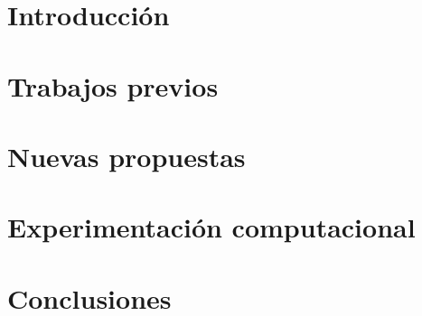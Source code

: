 \documentclass[11pt,a4paper]{tesis}
\begin{document}
\def\titulo{Licenciado }
\def\autor{Amit Stein, Juan Andrés Knebel}
\def\tituloTesis{Nuevos algoritmos para recuperación de ``ítems empaquetados'': \mbox{Algo}}
\def\runtitulo{Nuevos algoritmos para recuperación de ``ítems empaquetados''}
\def\runtitle{New Algorithms for composite retrival}
\def\director{Obi-Wan Kenobi}
\def\codirector{Master Yoda}
\def\lugar{Buenos Aires, 2016}
%

\frontmatter
\pagestyle{empty}


\cleardoublepage
%



\cleardoublepage
\tableofcontents

\mainmatter
\pagestyle{headings}


\chapter{Introducción}
\label{chap:introduccion}

\chapter{Trabajos previos}
\label{chap:trabajos-previos}

\chapter{Nuevas propuestas}
\label{chap:nuevas-propuestas}

\chapter{Experimentación computacional}
\label{chap:experimentacion}

\chapter{Conclusiones}
\label{chap:conclusiones}

%


\backmatter

 
\end{document}
